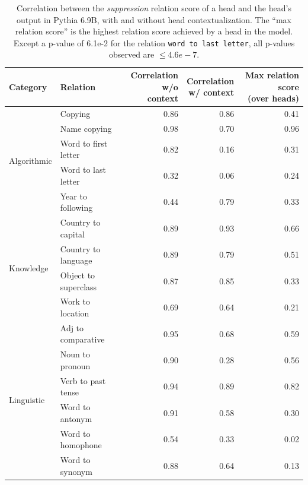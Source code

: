 \documentclass[11pt]{article}
\newcommand{\PythiaSevenB}{Pythia 6.9B}
\begin{document}
\begin{table}[p]
\centering
\footnotesize

\begin{tabular}{llrrr}
\toprule
Category & Relation & \makecell{Correlation\\w/o context} & \makecell{Correlation\\w/ context} & \makecell{Max relation score\\(over heads)} \\
\midrule
\multirow{5}{*}{Algorithmic} & Copying & 0.86 & 0.86 & 0.41 \\
 & Name copying & 0.98 & 0.70 & 0.96 \\
 & Word to first letter & 0.82 & 0.16 & 0.31 \\
 & Word to last letter & 0.32 & 0.06 & 0.24 \\
 & Year to following & 0.44 & 0.79 & 0.33 \\
 \midrule
\multirow{4}{*}{Knowledge} & Country to capital & 0.89 & 0.93 & 0.66 \\
 & Country to language & 0.89 & 0.79 & 0.51 \\
 & Object to superclass & 0.87 & 0.85 & 0.33 \\
 & Work to location & 0.69 & 0.64 & 0.21 \\
 \midrule
\multirow{6}{*}{Linguistic} & Adj to comparative & 0.95 & 0.68 & 0.59 \\
 & Noun to pronoun & 0.90 & 0.28 & 0.56 \\
 & Verb to past tense & 0.94 & 0.89 & 0.82 \\
 & Word to antonym & 0.91 & 0.58 & 0.30 \\
 & Word to homophone & 0.54 & 0.33 & 0.02 \\
 & Word to synonym & 0.88 & 0.64 & 0.13 \\
\bottomrule
\end{tabular}


\caption{Correlation between the \emph{suppression} relation score of a head and the head's output in \PythiaSevenB{}, with and without head contextualization. The ``max relation score'' is the highest relation score achieved by a head in the model.
Except a p-value of 6.1e-2 for the relation \texttt{word to last letter}, all p-values observed are $\leq 4.6e-7$.} 
\label{tab:Dynamic_results_pythia_7b_supression}
\end{table}
\end{document}
